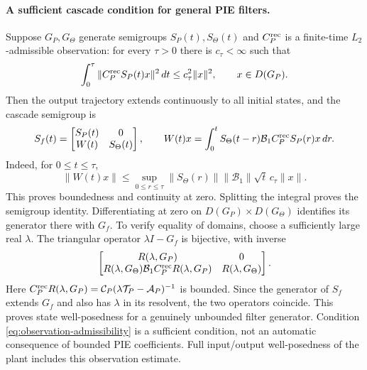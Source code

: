\documentclass[11pt,a4paper]{article}
\begin{document}
\paragraph{A sufficient cascade condition for general PIE filters.}
Suppose $G_P,G_\Theta$ generate semigroups $S_P(t),S_\Theta(t)$ and
$C_P^{\rm rec}$ is a finite-time $L_2$-admissible observation:
for every $\tau>0$ there is $c_\tau<\infty$ such that
\begin{equation}\label{eq:observation-admissibility}
 \int_0^\tau\|C_P^{\rm rec}S_P(t)x\|^2\,dt
 \leq c_\tau^2\|x\|^2,\qquad x\in D(G_P).
\end{equation}
Then the output trajectory extends continuously to all initial states,
and the cascade semigroup is
\[
 S_f(t)=\begin{bmatrix}S_P(t)&0\\W(t)&S_\Theta(t)\end{bmatrix},
 \qquad
 W(t)x=\int_0^t S_\Theta(t-r)\mathcal B_1
                   C_P^{\rm rec}S_P(r)x\,dr.
\]
Indeed, for $0\leq t\leq\tau$,
\[
 \|W(t)x\|\leq
 \sup_{0\leq r\leq\tau}\|S_\Theta(r)\|
 \|\mathcal B_1\|\sqrt{t}\,c_\tau\|x\|.
\]
This proves boundedness and continuity at zero. Splitting the integral
proves the semigroup identity. Differentiating at zero on
$D(G_P)\times D(G_\Theta)$ identifies its generator there with $G_f$.
To verify equality of domains, choose a sufficiently large real $\lambda$.
The triangular operator $\lambda I-G_f$ is bijective, with inverse
\[
 \begin{bmatrix}
 R(\lambda,G_P)&0\\
 R(\lambda,G_\Theta)\mathcal B_1C_P^{\rm rec}R(\lambda,G_P)
 &R(\lambda,G_\Theta)
 \end{bmatrix}.
\]
Here $C_P^{\rm rec}R(\lambda,G_P)
=\mathcal C_P(\lambda\mathcal T_P-\mathcal A_P)^{-1}$ is bounded.
Since the generator of $S_f$ extends $G_f$ and also has $\lambda$ in its
resolvent, the two operators coincide. This proves state well-posedness
for a genuinely unbounded filter generator. Condition
\eqref{eq:observation-admissibility} is a sufficient condition, not an
automatic consequence of bounded PIE coefficients. Full input/output
well-posedness of the plant includes this observation estimate.
\end{document}
